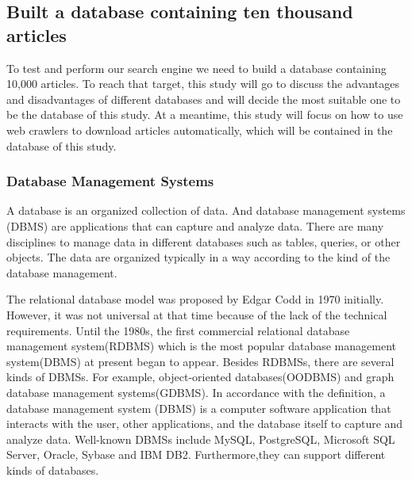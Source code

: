 
\subsection{Built a database containing ten thousand articles}

 To test and perform our search engine we need to build a database containing 10,000 articles.
To reach that target, this study will go to discuss the advantages and disadvantages of different databases and will decide the most suitable one to be the database of this study.
At a meantime, this study will focus on how to use web crawlers to download articles automatically, which will be contained in the database of this study.

\subsubsection{Database Management Systems}

A database is an organized collection of data.
And database management systems (DBMS) are applications that can capture and analyze data.
There are many disciplines to manage data in different databases such as tables, queries, or other objects. 
The data are organized typically in a way according to the kind of the database management. 

The relational database model was proposed by Edgar Codd in 1970 initially.
However, it was not universal at that time because of the lack of the technical requirements.
Until the 1980s, the first commercial relational database management system(RDBMS) which is the most popular database management system(DBMS) at present began to appear.
Besides RDBMSs, there are several kinds of DBMSs.
For example, object-oriented databases(OODBMS) and graph database management systems(GDBMS).
In accordance with the definition, a database management system (DBMS) is a computer software application that interacts with the user, other applications, and the database itself to capture and analyze data.
Well-known DBMSs include MySQL, PostgreSQL, Microsoft SQL Server, Oracle, Sybase and IBM DB2.
Furthermore,they can support different kinds of databases.




